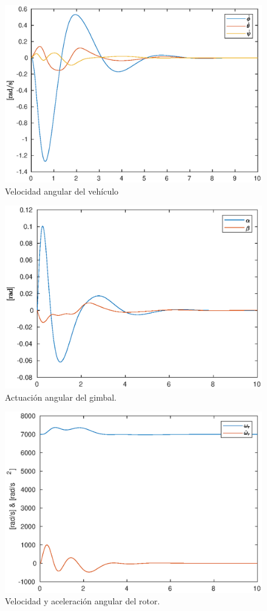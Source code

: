 \begin{figure}[!ht]
    \centering
    \includegraphics[width=0.6\linewidth]{fig/angvel_edf.eps}
    \caption{Velocidad angular del vehículo}
    \label{fig:angvel_edf.eps}
\end{figure}

\begin{figure}[!ht]
    \centering
    \includegraphics[width=0.6\linewidth]{fig/actuator_edf}
    \caption{Actuación angular del gimbal.}
    \label{fig:actuator_edf}
\end{figure}

\begin{figure}[!ht]
    \centering
    \includegraphics[width=0.6\linewidth]{fig/rotor_edf}
    \caption{Velocidad y aceleración angular del rotor.}
    \label{fig:rotor_edf}
\end{figure}

\null\newpage

